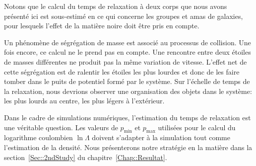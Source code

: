 Notons que le calcul du temps de relaxation à deux corps que nous avons présenté ici est sous-estimé en ce qui concerne les groupes et amas de galaxies,
pour lesquels l'effet de la matière noire doit être pris en compte.

Un phénomène de ségrégation de masse est associé au processus de collision. Une fois encore, ce calcul ne le prend pas en compte. Une rencontre
entre deux étoiles de masses différentes ne produit pas la même variation de vitesse. L'effet net de cette ségrégation est de ralentir les étoiles
les plus lourdes et donc de les faire tomber dans le puits de potentiel formé par le système. Sur l'échelle de temps de la relaxation, nous devrions
observer une organisation des objets dans le système: les plus lourds au centre, les plus légers à l'extérieur.

Dans le cadre de simulations numériques, l'estimation du temps de relaxation est une véritable question. Les valeurs de $p_{\min}$ et $p_{\max}$
utilisées pour le calcul du logarithme coulombien $\ln \Lambda$ doivent s'adapter à la simulation tout comme l'estimation de la densité. Nous
présenterons notre stratégie en la matière dans la section~\ref{Sec::2ndStudy} du chapitre~\ref{Chap::Resultat}.
